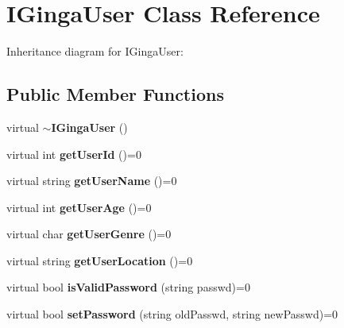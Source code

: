 \section{IGingaUser Class Reference}
\label{classbr_1_1pucrio_1_1telemidia_1_1ginga_1_1core_1_1contextmanager_1_1IGingaUser}
Inheritance diagram for IGingaUser:\subsection*{Public Member Functions}
\begin{CompactItemize}
\item 
virtual {\bf $\sim$IGingaUser} ()\label{classbr_1_1pucrio_1_1telemidia_1_1ginga_1_1core_1_1contextmanager_1_1IGingaUser_71badea39727eca62141873d3abed08a}

\item 
virtual int \textbf{getUserId} ()=0\label{classbr_1_1pucrio_1_1telemidia_1_1ginga_1_1core_1_1contextmanager_1_1IGingaUser_64190170b4dda0acb9f428ec24ca62c3}

\item 
virtual string \textbf{getUserName} ()=0\label{classbr_1_1pucrio_1_1telemidia_1_1ginga_1_1core_1_1contextmanager_1_1IGingaUser_46875fbe4ebc8b1be4c9ba66d5cb6f5f}

\item 
virtual int \textbf{getUserAge} ()=0\label{classbr_1_1pucrio_1_1telemidia_1_1ginga_1_1core_1_1contextmanager_1_1IGingaUser_b9b305cbc88abbfafc685696796e6501}

\item 
virtual char \textbf{getUserGenre} ()=0\label{classbr_1_1pucrio_1_1telemidia_1_1ginga_1_1core_1_1contextmanager_1_1IGingaUser_057081ee408b078caadaec6d970446fd}

\item 
virtual string \textbf{getUserLocation} ()=0\label{classbr_1_1pucrio_1_1telemidia_1_1ginga_1_1core_1_1contextmanager_1_1IGingaUser_480d6e285fdd7f72a200179090b4babb}

\item 
virtual bool \textbf{isValidPassword} (string passwd)=0\label{classbr_1_1pucrio_1_1telemidia_1_1ginga_1_1core_1_1contextmanager_1_1IGingaUser_a44e84e6cfec3fe8f000256844138c5f}

\item 
virtual bool \textbf{setPassword} (string oldPasswd, string newPasswd)=0\label{classbr_1_1pucrio_1_1telemidia_1_1ginga_1_1core_1_1contextmanager_1_1IGingaUser_db2012ecf266623cc96e5aa1f71c2abf}


\end{CompactItemize}
